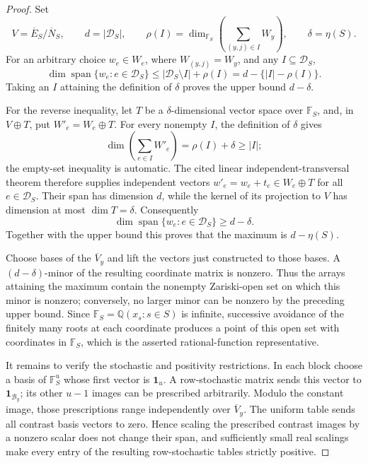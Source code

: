 \documentclass{article}
\begin{document}
\begin{proof}
Set
\[
V=\overline E_S/\overline N_S,\qquad d=|\mathcal D_S|,
\qquad \rho(I)=\dim_{\mathbb F_S}\left(\sum_{(y,j)\in I}W_y\right),
\qquad \delta=\eta(S).
\]
For an arbitrary choice \(w_e\in W_e\), where \(W_{(y,j)}=W_y\), and any \(I\subseteq\mathcal D_S\),
\[
\dim\operatorname{span}\{w_e:e\in\mathcal D_S\}
\le |\mathcal D_S\setminus I|+\rho(I)
=d-\{|I|-\rho(I)\}.
\]
Taking an \(I\) attaining the definition of \(\delta\) proves the upper bound \(d-\delta\).

For the reverse inequality, let \(T\) be a \(\delta\)-dimensional vector space over \(\mathbb F_S\), and, in \(V\oplus T\), put \(W'_e=W_e\oplus T\).  For every nonempty \(I\), the definition of \(\delta\) gives
\[
\dim\left(\sum_{e\in I}W'_e\right)=\rho(I)+\delta\ge |I|;
\]
the empty-set inequality is automatic.  The cited linear independent-transversal theorem therefore supplies independent vectors \(w'_e=w_e+t_e\in W_e\oplus T\) for all \(e\in\mathcal D_S\).  Their span has dimension \(d\), while the kernel of its projection to \(V\) has dimension at most \(\dim T=\delta\).  Consequently
\[
\dim\operatorname{span}\{w_e:e\in\mathcal D_S\}\ge d-\delta.
\]
Together with the upper bound this proves that the maximum is \(d-\eta(S)\).

Choose bases of the \(\overline V_y\) and lift the vectors just constructed to those bases.  A \((d-\delta)\)-minor of the resulting coordinate matrix is nonzero.  Thus the arrays attaining the maximum contain the nonempty Zariski-open set on which this minor is nonzero; conversely, no larger minor can be nonzero by the preceding upper bound.  Since \(\mathbb F_S=\mathbb Q(x_s:s\in S)\) is infinite, successive avoidance of the finitely many roots at each coordinate produces a point of this open set with coordinates in \(\mathbb F_S\), which is the asserted rational-function representative.

It remains to verify the stochastic and positivity restrictions.  In each block choose a basis of \(\mathbb F_S^u\) whose first vector is \(\mathbf 1_u\).  A row-stochastic matrix sends this vector to \(\mathbf 1_{\mathcal B_y}\); its other \(u-1\) images can be prescribed arbitrarily.  Modulo the constant image, those prescriptions range independently over \(\overline V_y\).  The uniform table sends all contrast basis vectors to zero.  Hence scaling the prescribed contrast images by a nonzero scalar does not change their span, and sufficiently small real scalings make every entry of the resulting row-stochastic tables strictly positive.


\end{proof}
\end{document}
